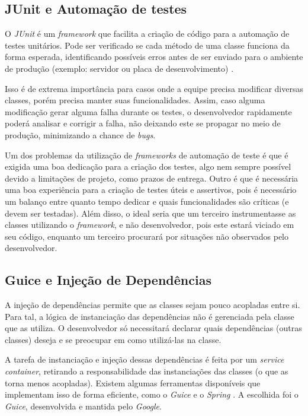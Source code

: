     \subsection{JUnit e Automação de testes}
    \label{methodology:tools:junit}

      O \textit{JUnit} é um \textit{framework} que facilita a criação de código para a automação de testes unitários. Pode ser verificado se cada método de uma classe funciona da forma esperada, identificando possíveis erros antes de ser enviado para o ambiente de produção (exemplo: servidor ou placa de desenvolvimento) \cite{developer-junit}.

      Isso é de extrema importância para casos onde a equipe precisa modificar diversas classes, porém precisa manter suas funcionalidades. Assim, caso alguma modificação gerar alguma falha durante os testes, o desenvolvedor rapidamente poderá analisar e corrigir a falha, não deixando este se propagar no meio de produção, minimizando a chance de \textit{bugs}.

      Um dos problemas da utilização de \textit{frameworks} de automação de teste é que é exigida uma boa dedicação para a criação dos testes, algo nem sempre possível devido a limitações de projeto, como prazos de entrega. Outro é que é necessária uma boa experiência para a criação de testes úteis e assertivos, pois é necessário um balanço entre quanto tempo dedicar e quais funcionalidades são críticas (e devem ser testadas). Além disso, o ideal seria que um terceiro instrumentasse as classes utilizando o \textit{framework}, e não desenvolvedor, pois este estará viciado em seu código, enquanto um terceiro procurará por situações não observados pelo desenvolvedor.

    \subsection{Guice e Injeção de Dependências}
    \label{methodology:tools:guice}

      A injeção de dependências permite que as classes sejam pouco acopladas entre si. Para tal, a lógica de instanciação das dependências não é gerenciada pela classe que as utiliza. O desenvolvedor só necessitará declarar quais dependências (outras classes) deseja e se preocupar em como utilizá-las na classe.

      A tarefa de instanciação e injeção dessas dependências é feita por um \textit{service container}, retirando a responsabilidade das instanciações das classes (o que as torna menos acopladas). Existem algumas ferramentas disponíveis que implementam isso de forma eficiente, como o \textit{Guice} e o \textit{Spring} \cite{developer-guice}. A escolhida foi o \textit{Guice}, desenvolvida e mantida pelo \textit{Google}.

